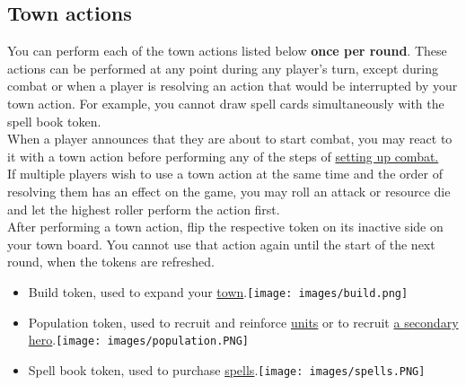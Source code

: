\documentclass[12pt]{article}
\begin{document}
\clearpage

\subsection*{Town actions}
You can perform each of the town actions listed below \textbf{once per round}. These actions can be performed at any point during any player’s turn, except during combat or when a player is resolving an action that would be interrupted by your town action. For example, you cannot draw spell cards simultaneously with the spell book token.\\[6pt]
When a player announces that they are about to start combat, you may react to it with a town action before performing any of the steps of \hyperlink{Combatsetup}{setting up combat.}\\[6pt]
If multiple players wish to use a town action at the same time and the order of resolving them has an effect on the game, you may roll an attack or resource die and let the highest roller perform the action first.\\[6pt]
After performing a town action, flip the respective token on its inactive side on your town board. You cannot use that action again until the start of the next round, when the tokens are refreshed.
\begin{itemize}
\item Build token, used to expand your \hyperlink{Town}{town}.\texttt{[image: images/build.png]}
\item Population token, used to recruit and reinforce \hyperlink{Units}{units} or to recruit \hyperlink{Secondary}{a secondary hero}.\texttt{[image: images/population.PNG]}
\item Spell book token, used to purchase \hyperlink{spells}{spells}.\texttt{[image: images/spells.PNG]}
\end{itemize}
\end{document}
